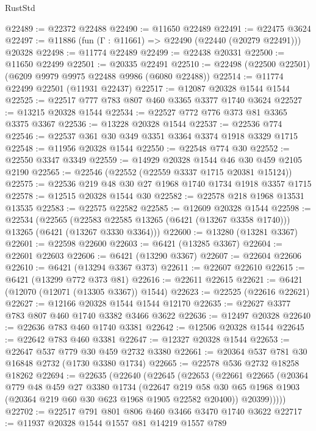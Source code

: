 \begin{lexlean}{RustStd}
\begin{coremodule}
@22489 := @22372 @22488
@22490 := @11650 @22489
@22491 := @22475 @3624
@22497 := @11886 (fun (Γ : @11661) => @22490 (@22440 (@20279 @22491))) @20328
@22498 := @11774 @22489
@22499 := @22438 @20331
@22500 := @11650 @22499
@22501 := @20335 @22491
@22510 := @22498 (@22500 @22501) (@6209 @9979 @9975 @22488 @9986 (@6080 @22488))
@22514 := @11774 @22499 @22501 (@11931 @22437)
@22517 := @12087 @20328 @1544 @1544
@22525 := @22517 @777 @783 @807 @460 @3365 @3377 @1740 @3624
@22527 := @13215 @20328 @1544
@22534 := @22527 @772 @776 @373 @81 @3365 @3375 @3367
@22536 := @13228 @20328 @1544
@22537 := @22536 @774
@22546 := @22537 @361 @30 @349 @3351 @3364 @3374 @1918 @3329 @1715
@22548 := @11956 @20328 @1544
@22550 := @22548 @774 @30
@22552 := @22550 @3347 @3349
@22559 := @14929 @20328 @1544 @46 @30 @459 @2105 @2190
@22565 := @22546 (@22552 (@22559 @3337 @1715 @20381 @15124))
@22575 := @22536 @219 @48 @30 @27 @1968 @1740 @1734 @1918 @3357 @1715
@22578 := @12515 @20328 @1544 @30
@22582 := @22578 @218 @1968 @13531 @13535
@22583 := @22575 @22582
@22585 := @12609 @20328 @1544
@22598 := @22534
    (@22565 (@22583 @22585 @13265 (@6421 (@13267 @3358 @1740))) @13265 (@6421 (@13267 @3330 @3364)))
@22600 := @13280 (@13281 @3367)
@22601 := @22598 @22600
@22603 := @6421 (@13285 @3367)
@22604 := @22601 @22603
@22606 := @6421 (@13290 @3367)
@22607 := @22604 @22606
@22610 := @6421 (@13294 @3367 @373)
@22611 := @22607 @22610
@22615 := @6421 (@13299 @772 @373 @81)
@22616 := @22611 @22615
@22621 := @6421 (@12070 (@12071 (@13305 @3367)) @1544)
@22623 := @22525 (@22616 @22621)
@22627 := @12166 @20328 @1544 @1544 @12170
@22635 := @22627 @3377 @783 @807 @460 @1740 @3382 @3466 @3622
@22636 := @12497 @20328
@22640 := @22636 @783 @460 @1740 @3381
@22642 := @12506 @20328 @1544
@22645 := @22642 @783 @460 @3381
@22647 := @12327 @20328 @1544
@22653 := @22647 @537 @779 @30 @459 @2732 @3380
@22661 := @20364 @537 @781 @30 @16848 @2732 (@1730 @3380 @1734)
@22665 := @22578 @536 @2732 @18258 @18262
@22694 := @22635
    (@22640
      (@22645
        (@22653
          (@22661
            @22665
            (@20364
              @779
              @48
              @459
              @27
              @3380
              @1734
              (@22647
                @219
                @58
                @30
                @65
                @1968
                @1903
                (@20364 @219 @60 @30 @623 @1968 @1905 @22582 @20400))
              @20399)))))
@22702 := @22517 @791 @801 @806 @460 @3466 @3470 @1740 @3622
@22717 := @11937
    @20328
    @1544
    @1557
    @81
    @14219
    @1557
    @789

\end{coremodule}
\end{lexlean}
